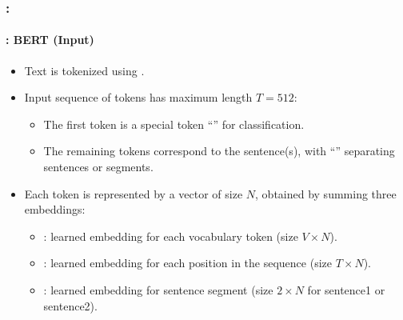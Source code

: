 \documentclass[xcolor=table]{beamer}
\begin{document}
\begin{frame}
	\frametitle{\insertshortsubtitle: \insertsection}
	\framesubtitle{\insertsubsection: BERT (Input)}
	
	\begin{itemize}
		\item Text is tokenized using  \cite{2016-wu-al}.
		\item Input sequence of tokens has maximum length $T = 512$:
		\begin{itemize}
			\item The first token is a special token ``\keyword{[CLS]}'' for classification.
			\item The remaining tokens correspond to the sentence(s), with ``\keyword{[SEP]}'' separating sentences or segments.
		\end{itemize}
		\item Each token is represented by a vector of size $N$, obtained by summing three embeddings:
		\begin{itemize}
			\item {}: learned embedding for each vocabulary token (size $V \times N$).
			\item {}: learned embedding for each position in the sequence (size $T \times N$).
			\item {}: learned embedding for sentence segment (size $2 \times N$ for sentence1 or sentence2).
		\end{itemize}
	\end{itemize}
	
\end{frame}
\end{document}
